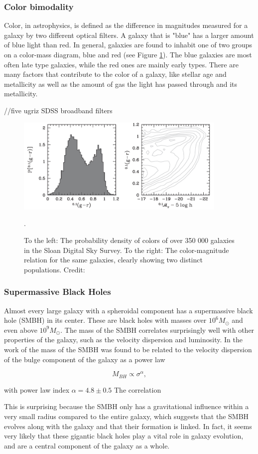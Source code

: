 \subsubsection{Color bimodality}
Color, in astrophysics, is defined as the difference in magnitudes measured for a galaxy by two different optical filters. A galaxy that is "blue" has a larger amount of blue light than red. In general, galaxies are found to inhabit one of two groups on a color-mass diagram, blue and red (see Figure \ref{color_bimodality}). The blue galaxies are most often late type galaxies, while the red ones are mainly early types. There are many factors that contribute to the color of a galaxy, like stellar age and metallicity as well as the amount of gas the light has passed through and its metallicity.

//five ugriz SDSS broadband filters

\begin{figure}
    \centering
    \includegraphics[width=0.9\textwidth]{images/color_bimodality.png}
    \caption{To the left: The probability density of colors of over 350 000 galaxies in the Sloan Digital Sky Survey. To the right: The color-magnitude relation for the same galaxies, clearly showing two distinct populations. Credit: \cite{Mo2010}}.
    \label{color_bimodality}
\end{figure}


\subsubsection{Supermassive Black Holes}
Almost every large galaxy with a spheroidal component has a supermassive black hole (SMBH) in its center. These are black holes with masses over $10^6 M_{\odot}$ and even above $10^9 M_{\odot}$. The mass of the SMBH correlates surprisingly well with other properties of the galaxy, such as the velocity dispersion and luminosity. In the work of \cite{Ferrarese2000} the mass of the SMBH was found to be related to the velocity dispersion of the bulge component of the galaxy as a power law


\begin{equation}
    M_{BH} \propto \sigma^{\alpha},
\end{equation}

with power law index $\alpha = 4.8 \pm 0.5$ The correlation 

This is surprising because the SMBH only has a gravitational influence within a very small radius compared to the entire galaxy, which suggests that the SMBH evolves along with the galaxy and that their formation is linked. In fact, it seems very likely that these gigantic black holes play a vital role in galaxy evolution, and are a central component of the galaxy as a whole.